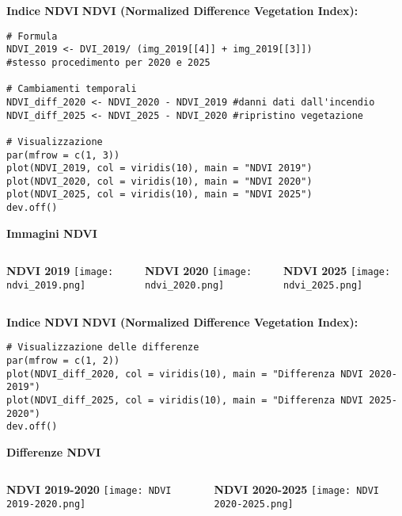 \documentclass{beamer}
\begin{document}
\begin{frame}[fragile]{\textbf{Indice NDVI}}
\textbf{NDVI (Normalized Difference Vegetation Index):}
\begin{lstlisting}
# Formula
NDVI_2019 <- DVI_2019/ (img_2019[[4]] + img_2019[[3]])
#stesso procedimento per 2020 e 2025

# Cambiamenti temporali
NDVI_diff_2020 <- NDVI_2020 - NDVI_2019 #danni dati dall'incendio
NDVI_diff_2025 <- NDVI_2025 - NDVI_2020 #ripristino vegetazione

# Visualizzazione
par(mfrow = c(1, 3))
plot(NDVI_2019, col = viridis(10), main = "NDVI 2019")
plot(NDVI_2020, col = viridis(10), main = "NDVI 2020")
plot(NDVI_2025, col = viridis(10), main = "NDVI 2025")
dev.off()
\end{lstlisting}
\end{frame}

\begin{frame}{\textbf{Immagini NDVI}}
\begin{columns}
    \centering
    \textbf{NDVI 2019}
    \texttt{[image: ndvi\_2019.png]}
    
    \centering
    \textbf{NDVI 2020}
    \texttt{[image: ndvi\_2020.png]}
    
    \centering
    \textbf{NDVI 2025}
    \texttt{[image: ndvi\_2025.png]}
\end{columns}
\end{frame}


\begin{frame}[fragile]{\textbf{Indice NDVI}}
\textbf{NDVI (Normalized Difference Vegetation Index):}
\begin{lstlisting}
# Visualizzazione delle differenze
par(mfrow = c(1, 2))
plot(NDVI_diff_2020, col = viridis(10), main = "Differenza NDVI 2020-2019")
plot(NDVI_diff_2025, col = viridis(10), main = "Differenza NDVI 2025-2020")
dev.off()
\end{lstlisting}
\end{frame}

\begin{frame}{\textbf{Differenze NDVI}}
\begin{columns}
    \centering
    \textbf{NDVI 2019-2020}
    \texttt{[image: NDVI 2019-2020.png]}
    
    \centering
    \textbf{NDVI 2020-2025}
    \texttt{[image: NDVI 2020-2025.png]}
\end{columns}
\end{frame}
\end{document}
